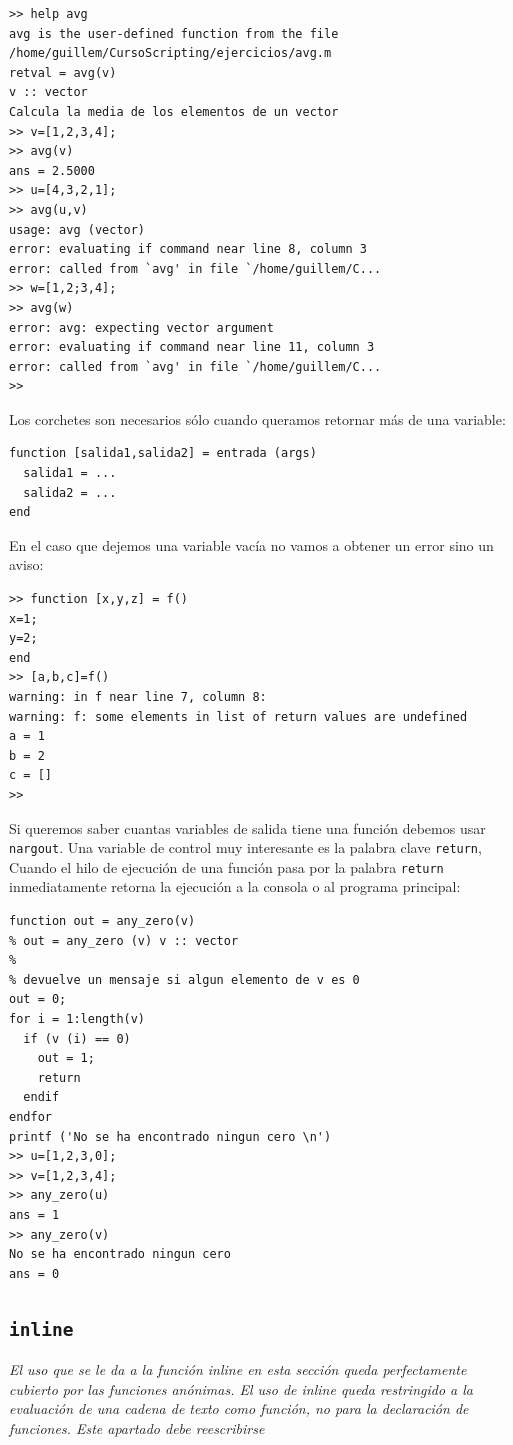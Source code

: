 \begin{lstlisting}
>> help avg
avg is the user-defined function from the file
/home/guillem/CursoScripting/ejercicios/avg.m   
retval = avg(v)
v :: vector
Calcula la media de los elementos de un vector   
>> v=[1,2,3,4];
>> avg(v)
ans = 2.5000
>> u=[4,3,2,1];
>> avg(u,v)
usage: avg (vector)
error: evaluating if command near line 8, column 3
error: called from `avg' in file `/home/guillem/C...
>> w=[1,2;3,4];
>> avg(w)
error: avg: expecting vector argument
error: evaluating if command near line 11, column 3
error: called from `avg' in file `/home/guillem/C...
>>
\end{lstlisting}
Los corchetes son necesarios sólo cuando queramos retornar más de una
variable:
\begin{lstlisting}
function [salida1,salida2] = entrada (args)
  salida1 = ...
  salida2 = ...
end
\end{lstlisting}
En el caso que dejemos una variable vacía no vamos a obtener un error
sino un aviso:

\begin{lstlisting}
>> function [x,y,z] = f()
x=1;
y=2;
end
>> [a,b,c]=f()
warning: in f near line 7, column 8:
warning: f: some elements in list of return values are undefined
a = 1
b = 2
c = []
>>                 
\end{lstlisting}
Si queremos saber cuantas variables de salida tiene una función
debemos usar \texttt{nargout}. Una variable de control
muy interesante es la palabra clave \texttt{return},
Cuando el hilo de ejecución de una función pasa por la palabra
\texttt{return} inmediatamente retorna la ejecución a la consola o al
programa principal:

\begin{lstlisting}
function out = any_zero(v)
% out = any_zero (v) v :: vector
%
% devuelve un mensaje si algun elemento de v es 0
out = 0;
for i = 1:length(v)
  if (v (i) == 0)
    out = 1;
    return
  endif
endfor
printf ('No se ha encontrado ningun cero \n')   
>> u=[1,2,3,0];
>> v=[1,2,3,4];
>> any_zero(u)
ans = 1
>> any_zero(v)
No se ha encontrado ningun cero
ans = 0
\end{lstlisting}

\subsection{\texttt{inline}}

\emph{El uso que se le da a la función inline en esta sección queda
  perfectamente cubierto por las funciones anónimas.  El uso de inline
  queda restringido a la evaluación de una cadena de texto como
  función, no para la declaración de funciones.  Este apartado debe
  reescribirse}

